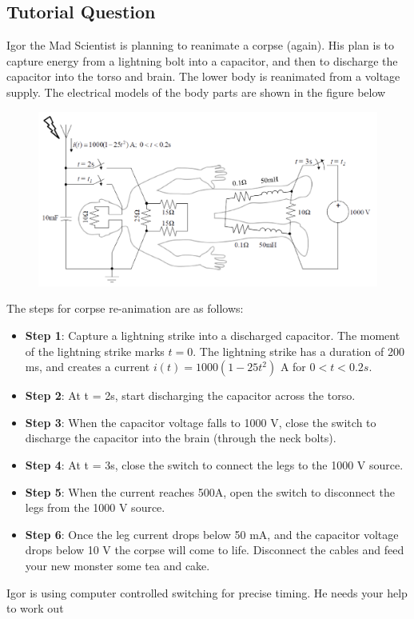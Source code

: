 \subsection{Tutorial Question}
    Igor the Mad Scientist is planning to reanimate a corpse (again). His plan is to capture energy
    from a lightning bolt into a capacitor, and then to discharge the capacitor into the torso and
    brain. The lower body is reanimated from a voltage supply. The electrical models of the body
    parts are shown in the figure below
    \begin{figure}[H]
        \centering
        \includegraphics[width=0.6\linewidth]{tutorials/figures/frankenstein.png}
    \end{figure}
    The steps for corpse re-animation are as follows:
    \begin{itemize}
        \item \textbf{Step 1}: Capture a lightning strike into a discharged capacitor. The moment of the lightning
        strike marks $t = 0$. The lightning strike has a duration of 200 ms, and creates a current $i(t) =
        1000(1 - 25t^2)$ A for $0 < t < 0.2s$.
        \item \textbf{Step 2}: At t = 2s, start discharging the capacitor across the torso.
        \item \textbf{Step 3}: When the capacitor voltage falls to 1000 V, close the switch to discharge the capacitor
        into the brain (through the neck bolts).
        \item \textbf{Step 4}: At t = 3s, close the switch to connect the legs to the 1000 V source.
        \item \textbf{Step 5}: When the current reaches 500A, open the switch to disconnect the legs from the 1000 V
        source.
        \item \textbf{Step 6}: Once the leg current drops below 50 mA, and the capacitor voltage drops below 10 V
        the corpse will come to life. Disconnect the cables and feed your new monster some tea and
        cake.
    \end{itemize}
    Igor is using computer controlled switching for precise timing. He needs your help to work out

